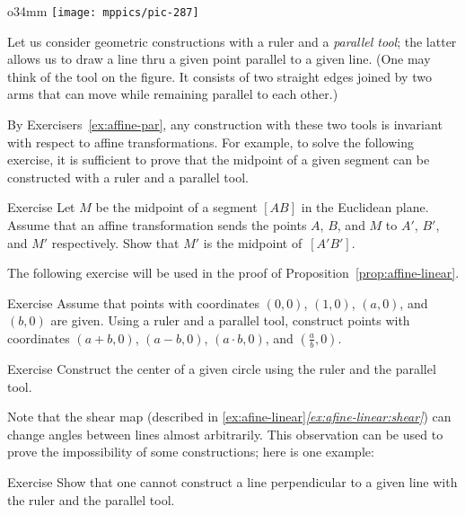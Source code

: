 \begin{wrapfigure}{o}{34mm}
\vskip-10mm
\centering
\texttt{[image: mppics/pic-287]}
\end{wrapfigure}

Let us consider geometric constructions with a ruler and a \emph{parallel tool};
the latter allows us to draw a line thru a given point parallel to a given line.
(One may think of the tool on the figure.
It consists of two straight edges joined by two arms that can move while remaining parallel to each other.)

By Exercisers~\ref{ex:affine-par}, any construction with these two tools is invariant with respect to affine transformations.
For example, 
to solve the following exercise,
it is sufficient to prove that the midpoint of a given segment can be constructed with a ruler and a parallel tool.

\begin{thm}{Exercise}\label{ex:midpoint-affine}
Let $M$ be the  midpoint of a segment $[AB]$ in the Euclidean plane.
Assume that an affine transformation sends the points $A$, $B$, and $M$
to $A'$, $B'$, and $M'$ respectively.
Show that $M'$ is the midpoint of~$[A'B']$.
\end{thm}

The following exercise will be used in the proof of Proposition~\ref{prop:affine-linear}.

\begin{thm}{Exercise}\label{ex:R-hom}
Assume that points with coordinates $(0,0)$, $(1,0)$, $(a,0)$, and $(b,0)$ are given.
Using a ruler and a parallel tool, construct points with coordinates $(a+b,0)$, $(a-b,0)$, $(a\cdot b,0)$, and $(\tfrac a b,0)$.
\end{thm}

\begin{thm}{Exercise}\label{ex:center-circ-affine}
Construct the center of a given circle using the ruler and the parallel tool.
\end{thm}

Note that the shear map (described in \ref{ex:afine-linear}\textit{\ref{ex:afine-linear:shear}}) can change angles between lines almost arbitrarily.
This observation can be used to prove the impossibility of some constructions;
here is one example:

\begin{thm}{Exercise}\label{ex:affine-perp}
Show that one cannot construct a line perpendicular to a given line with the ruler and the parallel tool.
\end{thm}

